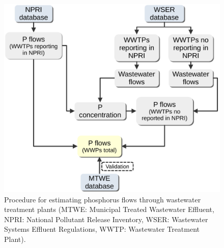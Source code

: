 \documentclass[]{elsarticle}
\begin{document}
\begin{figure}[H]
	\centering
		\includegraphics[width=0.6\linewidth, trim={0cm 0cm 0cm 0cm},clip]{Figures/FigJorge.pdf} 
		\caption{Procedure for estimating phosphorus flows through wastewater treatment plants (MTWE: Municipal Treated Wastewater Effluent, NPRI: National Pollutant Release Inventory, WSER: Wastewater Systems Effluent Regulations, WWTP: Wastewater Treatment Plant).}
		\label{fig:MethodWWTPs}
	\end{figure}
\end{document}
